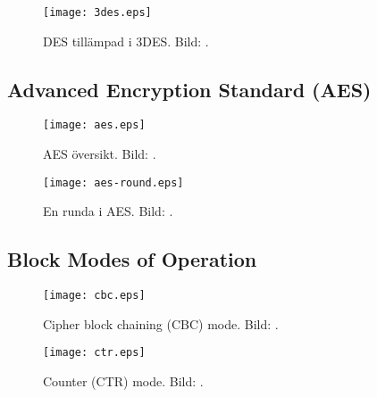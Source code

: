 \documentclass{beamer}
\theoremstyle{definition}
\begin{document}
\begin{frame}{\insertsubsectionhead}
  \begin{figure}
    \texttt{[image: 3des.eps]}
    \caption{DES tillämpad i 3DES.
    Bild: \cite{Stallings2011can}.}
  \end{figure}
\end{frame}

\subsection{Advanced Encryption Standard (AES)}

\begin{frame}{\insertsubsectionhead}
  \begin{figure}
    \texttt{[image: aes.eps]}
    \caption{AES översikt.
    Bild: \cite{Stallings2011can}.}
  \end{figure}
\end{frame}

\begin{frame}{\insertsubsectionhead}
  \begin{figure}
    \texttt{[image: aes-round.eps]}
    \caption{En runda i AES.
    Bild: \cite{Stallings2011can}.}
  \end{figure}
\end{frame}

\subsection{Block Modes of Operation}

\begin{frame}{\insertsubsectionhead}
  \begin{figure}
    \texttt{[image: cbc.eps]}
    \caption{Cipher block chaining (CBC) mode.
    Bild: \cite{Stallings2011can}.}
  \end{figure}
\end{frame}


\begin{frame}{\insertsubsectionhead}
  \begin{figure}
    \texttt{[image: ctr.eps]}
    \caption{Counter (CTR) mode.
    Bild: \cite{Stallings2011can}.}
  \end{figure}
\end{frame}
\end{document}
